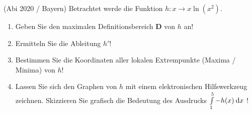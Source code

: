 \item (Abi 2020 / Bayern) Betrachtet werde die Funktion $h: x \to x \ln(x^2)$.

\begin{enumerate}
\item Geben Sie den maximalen Definitionsbereich $\mathbf{D}$ von $h$ an!
\item Ermitteln Sie die Ableitung $h'$!
\item Bestimmen Sie die Koordinaten aller lokalen Extrempunkte (Maxima / Minima) von $h$!
\item Lassen Sie sich den Graphen von $h$ mit einem elektronischen Hilfswerkzeug zeichnen. Skizzieren Sie grafisch die Bedeutung des Ausdrucks $\int\limits_1^5 -h(x)  \:\mathrm{d}{x}$ !
\end{enumerate}

